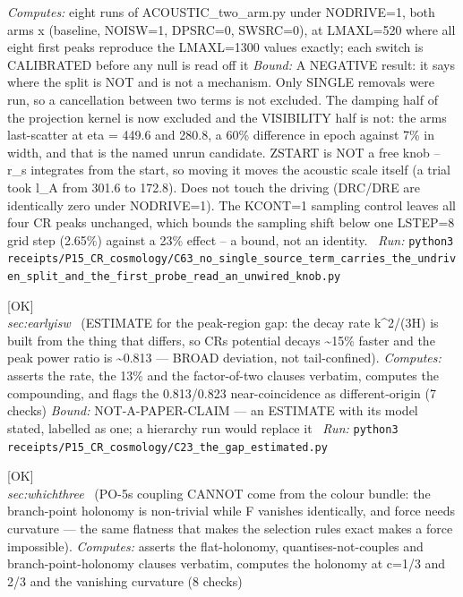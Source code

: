 \begin{description}
\emph{Computes:} eight runs of ACOUSTIC\_two\_arm.py under NODRIVE=1, both arms x (baseline, NOISW=1, DPSRC=0, SWSRC=0), at LMAXL=520 where all eight first peaks reproduce the LMAXL=1300 values exactly; each switch is CALIBRATED before any null is read off it
 \emph{Bound:} A NEGATIVE result: it says where the split is NOT and is not a mechanism. Only SINGLE removals were run, so a cancellation between two terms is not excluded. The damping half of the projection kernel is now excluded and the VISIBILITY half is not: the arms last-scatter at eta = 449.6 and 280.8, a 60\% difference in epoch against 7\% in width, and that is the named unrun candidate. ZSTART is NOT a free knob -- r\_s integrates from the start, so moving it moves the acoustic scale itself (a trial took l\_A from 301.6 to 172.8). Does not touch the driving (DRC/DRE are identically zero under NODRIVE=1). The KCONT=1 sampling control leaves all four CR peaks unchanged, which bounds the sampling shift below one LSTEP=8 grid step (2.65\%) against a 23\% effect -- a bound, not an identity.
\ \emph{Run:} \texttt{python3 receipts/P15\_CR\_cosmology/C63\_no\_single\_source\_term\_carries\_the\_undriven\_split\_and\_the\_first\_probe\_read\_an\_unwired\_knob.py}
\item[\label{rcpt:C23_the_gap_estimated}\texttt{C23\_the\_gap\_estimated}]\hfill\textsf{[OK]}\\
\textit{sec:earlyisw} \ (ESTIMATE for the peak-region gap: the decay rate k\textasciicircum{}2/(3H) is built from the thing that differs, so CRs potential decays \textasciitilde{}15\% faster and the peak power ratio is \textasciitilde{}0.813 --- BROAD deviation, not tail-confined). 
\emph{Computes:} asserts the rate, the 13\% and the factor-of-two clauses verbatim, computes the compounding, and flags the 0.813/0.823 near-coincidence as different-origin (7 checks)
 \emph{Bound:} NOT-A-PAPER-CLAIM --- an ESTIMATE with its model stated, labelled as one; a hierarchy run would replace it
\ \emph{Run:} \texttt{python3 receipts/P15\_CR\_cosmology/C23\_the\_gap\_estimated.py}
\item[\label{rcpt:B16_the_coupling_cannot_come_from_this_bundle}\texttt{B16\_the\_coupling\_cannot\_come\_from\_this\_bundle}]\hfill\textsf{[OK]}\\
\textit{sec:whichthree} \ (PO-5s coupling CANNOT come from the colour bundle: the branch-point holonomy is non-trivial while F vanishes identically, and force needs curvature --- the same flatness that makes the selection rules exact makes a force impossible). 
\emph{Computes:} asserts the flat-holonomy, quantises-not-couples and branch-point-holonomy clauses verbatim, computes the holonomy at c=1/3 and 2/3 and the vanishing curvature (8 checks)

\end{description}
